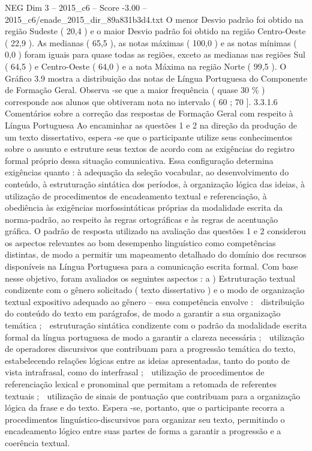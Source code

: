 \begin{textsample}{NEG Dim 3 – 2015\_c6 – Score -3.00 – 2015\_c6/enade\_2015\_dir\_89a831b3d4.txt}
O menor Desvio padrão foi obtido na região Sudeste ( 20,4 ) e o maior Desvio padrão foi obtido na região Centro-Oeste ( 22,9 ).
As medianas ( 65,5 ), as notas máximas ( 100,0 ) e as notas mínimas ( 0,0 ) foram iguais para quase todas as regiões, exceto as medianas nas regiões Sul ( 64,5 ) e Centro-Oeste ( 64,0 ) e a nota Máxima na região Norte ( 99,5 ).
O Gráfico 3.9 mostra a distribuição das notas de Língua Portuguesa do Componente de Formação Geral.
Observa -se que a maior frequência ( quase 30 \% ) corresponde aos alunos que obtiveram nota no intervalo ( 60 ; 70 ]. 3.3.1.6 Comentários sobre a correção das respostas de Formação Geral com respeito à Língua Portuguesa Ao encaminhar as questões 1 e 2 na direção da produção de um texto dissertativo, espera -se que o participante utilize seus conhecimentos sobre o assunto e estruture seus textos de acordo com as exigências do registro formal próprio dessa situação comunicativa.
Essa configuração determina exigências quanto : à adequação da seleção vocabular, ao desenvolvimento do conteúdo, à estruturação sintática dos períodos, à organização lógica das ideias, à utilização de procedimentos de encadeamento textual e referenciação, à obediência às exigências morfossintáticas próprias da modalidade escrita da norma-padrão, ao respeito às regras ortográficas e às regras de acentuação gráfica.
O padrão de resposta utilizado na avaliação das questões 1 e 2 considerou os aspectos relevantes ao bom desempenho linguístico como competências distintas, de modo a permitir um mapeamento detalhado do domínio dos recursos disponíveis na Língua Portuguesa para a comunicação escrita formal.
Com base nesse objetivo, foram avaliados os seguintes aspectos : a ) Estruturação textual condizente com o gênero solicitado ( texto dissertativo ) e o modo de organização textual expositivo adequado ao gênero – essa competência envolve :  distribuição do conteúdo do texto em parágrafos, de modo a garantir a sua organização temática ;  estruturação sintática condizente com o padrão da modalidade escrita formal da língua portuguesa de modo a garantir a clareza necessária ;  utilização de operadores discursivos que contribuam para a progressão temática do texto, estabelecendo relações lógicas entre as ideias apresentadas, tanto do ponto de vista intrafrasal, como do interfrasal ;  utilização de procedimentos de referenciação lexical e pronominal que permitam a retomada de referentes textuais ;  utilização de sinais de pontuação que contribuam para a organização lógica da frase e do texto.
Espera -se, portanto, que o participante recorra a procedimentos linguístico-discursivos para organizar seu texto, permitindo o encadeamento lógico entre suas partes de forma a garantir a progressão e a coerência textual.

\end{textsample}
